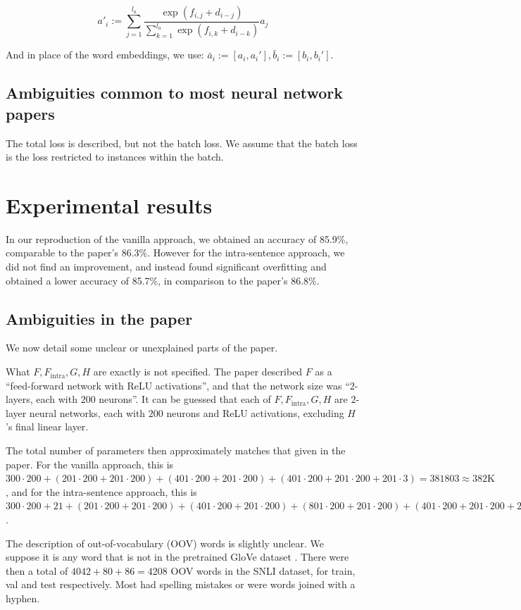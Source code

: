 \documentclass{article}
\begin{document}
\[a'_i := \sum_{j=1}^{l_a} \frac{\exp(f_{i,j} + d_{i-j})}{\sum_{k=1}^{l_a} \exp(f_{i,k} + d_{i-k})} a_j\]

And in place of the word embeddings, we use: $\bar{a}_i := [a_i, a_i'], \bar{b}_i := [b_i, b_i']$.

\subsection{Ambiguities common to most neural network papers}
The total loss is described, but not the batch loss. We assume that the batch loss is the loss restricted to instances within the batch.

\section{Experimental results}
In our reproduction of the vanilla approach, we obtained an accuracy of 85.9\%, comparable to the paper's 86.3\%. However for the intra-sentence approach, we did not find an improvement, and instead found significant overfitting and obtained a lower accuracy of 85.7\%, in comparison to the paper's 86.8\%.

\subsection{Ambiguities in the paper}
We now detail some unclear or unexplained parts of the paper.

What $F, F_\text{intra}, G, H$ are exactly is not specified. The paper described $F$ as a ``feed-forward network with ReLU activations'', and that the network size was ``$2$-layers, each with $200$ neurons''. It can be guessed that each of $F, F_\text{intra}, G, H$ are $2$-layer neural networks, each with $200$ neurons and ReLU activations, excluding $H$'s final linear layer.

The total number of parameters then approximately matches that given in the paper. For the vanilla approach, this is $300 \cdot 200 + (201 \cdot 200 + 201 \cdot 200) + (401 \cdot 200 + 201 \cdot 200) + (401 \cdot 200 + 201 \cdot 200 + 201 \cdot 3) = 381803 \approx 382\text{K}$, and for the intra-sentence approach, this is $300 \cdot 200 + 21 + (201 \cdot 200 + 201 \cdot 200) + (401 \cdot 200 + 201 \cdot 200) + (801 \cdot 200 + 201 \cdot 200) + (401 \cdot 200 + 201 \cdot 200 + 201 \cdot 3) = 582224 \approx 582\text{K}$.

The description of out-of-vocabulary (OOV) words is slightly unclear. We suppose it is any word that is not in the pretrained GloVe dataset \citep{pennington2014glove}. There were then a total of $4042 + 80 + 86 = 4208$ OOV words in the SNLI dataset, for train, val and test respectively. Most had spelling mistakes or were words joined with a hyphen.
\end{document}
